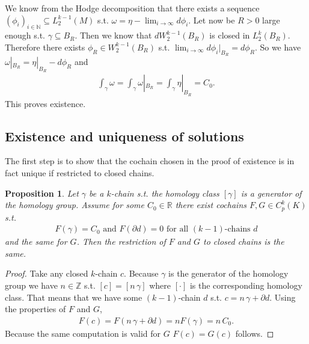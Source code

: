 \documentclass[12pt,a4paper]{article}
\newtheorem{proposition}{Proposition}
\newcommand{\real}{\mathbb{R}}
\begin{document}
We know from the Hodge decomposition that there exists a sequence
$(\phi_i)_{i\in \mathbb{N}} \subseteq L^{k-1}_2(M)$ s.t. 
$\omega = \eta - \lim_{i \rightarrow \infty} d\phi_i$.
Let now be $R>0$ large enough s.t. $\gamma \subseteq B_R$. Then we know that
$d W^{k-1}_2(B_R)$ is closed in $L_2^k(B_R)$. Therefore there exists 
$\phi_R \in  W^{k-1}_2(B_R)$ s.t. 
$\lim_{i \rightarrow \infty} d\phi_i|_{B_R} = d\phi_R$. So we have
$\omega|_{B_R} = \eta|_{B_R} - d\phi_R$ and 
\begin{align*}
\int_\gamma \omega = \int_\gamma \omega|_{B_R} = \int_\gamma \eta|_{B_R} = C_0.
\end{align*}
This proves existence.

\subsection{Existence and uniqueness of solutions}

The first step is to show that the cochain chosen in the proof of existence
is in fact unique if restricted to closed chains.

\begin{proposition}
    Let $\gamma$ be a $k$-chain s.t. the homology class $[\gamma]$ 
    is a generator of the homology group. Assume for some $C_0 \in \real$ 
    there exist cochains $F,G \in C^k_p(K)$ s.t.
    \begin{align*}
    F(\gamma) = C_0 \text{ and } F(\partial d) = 0 
    \text{ for all } (k-1) \text{-chains } d
    \end{align*}
    and the same for $G$. Then the restriction of $F$ and $G$ to closed 
    chains is the same.
\end{proposition} \label{uniqueness_cochain}
\begin{proof}
    Take any closed $k$-chain $c$. Because $\gamma$ is the generator of the 
    homology group we have $n \in \mathbb{Z}$ s.t. $[c] = [n \, \gamma]$
    where $[\cdot]$ is the corresponding homology class. That means that we have
    some $(k-1)$-chain $d$ s.t. $c = n \, \gamma + \partial d$. Using the 
    properties of $F$ and $G$,
    \begin{align*}
        F(c) = F(n \, \gamma + \partial d) = n F(\gamma) = n \, C_0.
    \end{align*}
    Because the same computation is valid for $G$ $F(c) = G(c)$ follows.
\end{proof}
\end{document}
